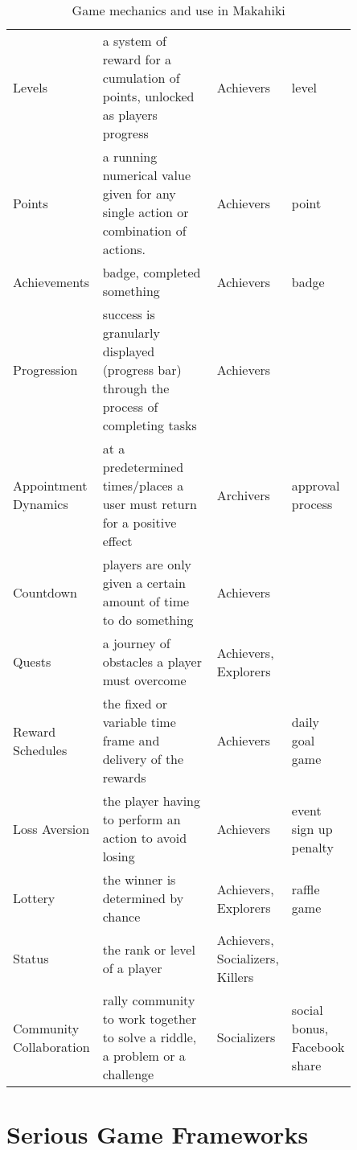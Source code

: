 \begin{table}[ht!]
  \centering
        \begin{tabular}{| P{0.14\linewidth} | P{0.45\linewidth} | P{0.12\linewidth} | P{0.14\linewidth}|} 
        \hline
       &  &  &   \\
        \hline
        Levels  	& a system of reward for a cumulation of points, unlocked as players progress & Achievers & level \\
        \hline
        Points & a running numerical value given for any single action or combination of actions. & Achievers & point \\
        \hline
        Achievements 	& badge, completed something  & Achievers  & badge \\
        \hline
        Progression & success is granularly displayed (progress bar) through the process of completing tasks & Achievers & \\
        \hline
	Appointment Dynamics & at a predetermined times/places a user must return for a positive effect  & Archivers & approval process \\
        \hline
	Countdown & players are only given a certain amount of time to do something & Achievers & \\
        \hline
        Quests & a journey of obstacles a player must overcome & Achievers, Explorers & \\
        \hline
	Reward Schedules & the fixed or variable time frame and delivery of the rewards & Achievers & daily goal game \\
        \hline
	Loss Aversion & the player having to perform an action to avoid losing & Achievers & event sign up penalty\\
        \hline
	Lottery & the winner is determined by chance & Achievers, Explorers & raffle game \\
        \hline
	Status & the rank or level of a player & Achievers, Socializers, Killers & \\
        \hline
	Community Collaboration & rally community to work together to solve a riddle, a problem or a challenge & Socializers & social bonus, Facebook share \\
        \hline
        \end{tabular}
        \caption{Game mechanics and use in Makahiki}
        \label{table:game-mechanics}
\end{table}

\section{Serious Game Frameworks}
\label{sec:rel-sg-framework}

